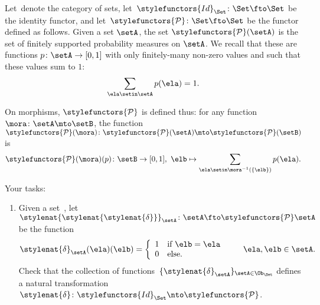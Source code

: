 \begin{gradedexercise}
    \label{ex:FinProbMonad}

    Let~\Set denote the category of sets, let~$\stylefunctors{Id}_\Set \colon \Set \fto \Set$ be the identity functor, and let~$\stylefunctors{\mathcal{P}} \colon \Set \fto \Set$ be the functor defined as follows.
    Given a set $\setA$, the set $\stylefunctors{\mathcal{P}}(\setA)$ is the set of finitely supported probability measures on $\setA$.
    We recall that these are functions $p \colon \setA \to [0,1]$ with only finitely-many non-zero values and such that these values sum to $1$:
    \begin{equation}
        \sum_{\ela \setin \setA} p(\ela) = 1.
    \end{equation}

    On morphisms, $\stylefunctors{\mathcal{P}}$ is defined thus: for any function $\mora \colon \setA \mto \setB$, the function $\stylefunctors{\mathcal{P}}(\mora) \colon \stylefunctors{\mathcal{P}}(\setA) \mto \stylefunctors{\mathcal{P}}(\setB)$ is
    \begin{equation}
        \stylefunctors{\mathcal{P}}(\mora)(p) \colon \setB \to [0,1], \ \elb \mapsto \sum_{\ela \setin \mora^{-1}(\{ \elb \})} p(\ela).
    \end{equation}

    Your tasks:
    \begin{enumerate}
        \item
              Given a set~\setA, let~$\stylenat{\stylenat{\stylenat{\delta}}}_{\setA} \colon \setA \fto \stylefunctors{\mathcal{P}} \setA$ be the function
              \begin{equation}
                  \stylenat{\delta}_\setA (\ela)(\elb) = \left\{\begin{array}{ll}
                      1 & \text{if } \elb = \ela \\
                      0 & \text{else.
                      }
                  \end{array}\right.{}
                  \quad \quad \ela, \elb \in \setA.
              \end{equation}
              Check that the collection of functions~$\{ \stylenat{\delta}_{\setA} \}_{\setA \in \Ob_{\Set}}$ defines a natural transformation~$\stylenat{\delta}\colon \stylefunctors{Id}_\Set \nto \stylefunctors{\mathcal{P}}$.


\end{enumerate}
\end{gradedexercise}

